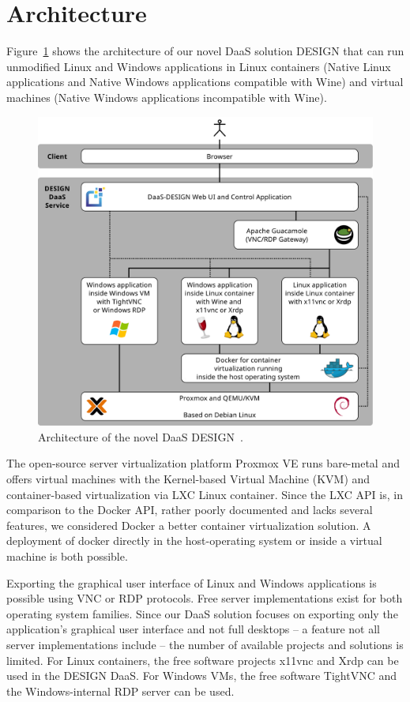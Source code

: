 \documentclass[runningheads]{llncs}
\begin{document}
\section{Architecture}\label{sec:RecommendDaaSarchitecture}
% 
Figure~\ref{figure_architecture} shows the architecture
of our novel DaaS solution DESIGN
that can run unmodified Linux and Windows applications in Linux containers
(Native Linux applications and Native Windows applications compatible with Wine)
and virtual machines (Native Windows applications incompatible with Wine).
\begin{figure}
	\centering
	\includegraphics[width=.75\linewidth]{images/DaaS_DESIGN_Architecture_v12_english.pdf}
	\caption{Architecture of the novel DaaS DESIGN~\cite{OJCC_2023v8i1n01_Baun}.}
	\label{figure_architecture}
\end{figure}

The open-source server virtualization platform Proxmox VE runs bare-metal and offers virtual machines with the Kernel-based Virtual Machine (KVM) and container-based virtualization via LXC Linux container. Since the LXC API is, in comparison to the Docker API, rather poorly documented and lacks several features, we considered Docker a better container virtualization solution. A deployment of docker directly in the host-operating system or inside a virtual machine is both possible.

Exporting the graphical user interface of Linux and Windows applications
is possible using VNC or RDP protocols.
Free server implementations exist for both operating system families.
Since our DaaS solution focuses on exporting only the application's graphical user interface
and not full desktops -- a feature not all server implementations include --
the number of available projects and solutions is limited.
For Linux containers, the free software projects
x11vnc and Xrdp can be used in the DESIGN DaaS.
For Windows VMs, the free software TightVNC
and the Windows-internal RDP server can be used.
\end{document}
